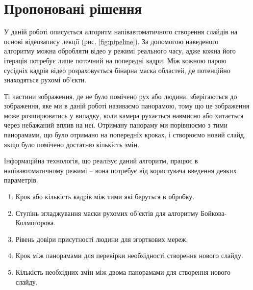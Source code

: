 \section{Пропоновані рішення}


У даній роботі описується алгоритм напівавтоматичного 
створення слайдів на основі відеозапису лекції (рис. \ref{fig:pipeline}).
За допомогою наведеного алгоритму можна обробляти відео 
у режимі реального часу, адже кожна його ітерація потребує 
лише поточний на попередні кадри. Між кожною парою 
сусідніх кадрів відео розраховується бінарна маска областей, де 
потенційно знаходяться рухомі об'єкти. 


Ті частини зображення, де не було помічено рух або людина, 
зберігаються до зображення, яке ми в даній роботі називаємо панорамою, тому що 
це зображення може розширюватись у випадку, коли камера рухається 
навмисно або хитається через небажаний вплив на неї. 
Отриману панораму ми порівнюємо з тими панорамами, що було отримано на 
попередніх кроках, і створюємо новий слайд, якщо було помічено 
достатню кількість змін.


Інформаційна технологія, що реалізує даний алгоритм, працює в 
напівавтоматичному режимі – вона потребує від користувача введення 
деяких параметрів.
\begin{enumerate}
    \item Крок або кількість кадрів між тими які беруться в обробку.
    \item Ступінь згладжування маски рухомих об'єктів для алгоритму Бойкова-Колмогорова.
    \item Рівень довіри присутності людини для згорткових мереж.
    \item Крок між панорамами для перевірки необхідності створення нового слайду.
    \item Кількість необхідних змін між двома панорамами для створення нового слайду.
\end{enumerate}


